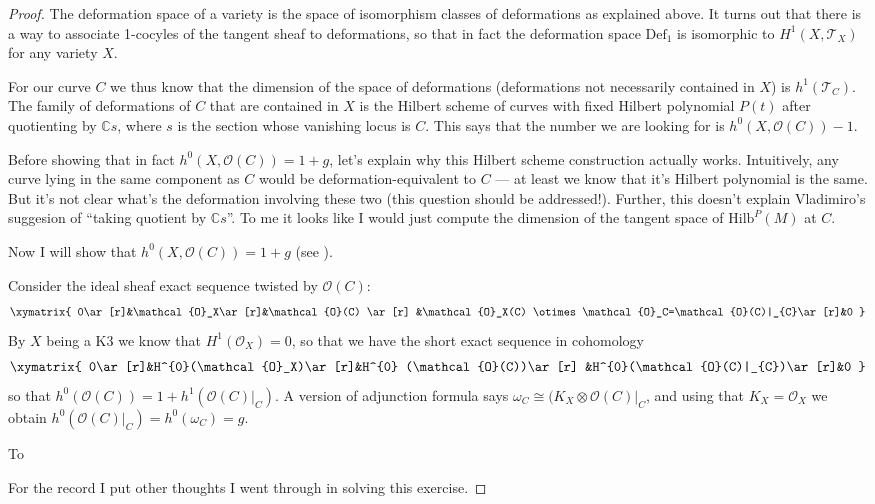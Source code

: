 \documentclass{book}
\begin{document}
\begin{proof}
The deformation space of a variety is the
space of isomorphism classes of
deformations as explained above. It turns out
that there is a way to associate
1-cocyles of the tangent sheaf to
deformations, so that in fact the deformation
space $\text{Def}_1$ is isomorphic to
$H^{1}(X,\mathcal{T}_X)$ for any variety
$X$.

For our curve $C$ we thus know that the
dimension of the space of deformations
(deformations not necessarily contained in
$X$) is $h^1(\mathcal{T}_C)$.  The
family of deformations of $C$ that are
contained in $X$ is the Hilbert scheme of
curves with fixed Hilbert polynomial $P(t)$
after quotienting by $\mathbb{C}s$,
where $s$ is the section whose vanishing
locus is  $C$.
This says that the number we are looking for
is $h^{0}(X,\mathcal{O}(C))-1$.

Before showing that in fact
$h^0(X,\mathcal{O}(C))=1+g$,
let's explain why this Hilbert scheme
construction actually works.
Intuitively, any curve lying in the same
component
as $C$ would be deformation-equivalent to $C$
--- at least we know that it's Hilbert
polynomial is the same.
But it's not clear what's the deformation
involving these two
(this question should be addressed!).
Further, this doesn't explain Vladimiro's
suggesion of ``taking quotient by
$\mathbb{C}s$''.
To me it looks like I would just compute the
dimension
of the tangent space of $\text{Hilb}^P(M)$ at
$C$.

Now I will show that
$h^0(X,\mathcal{O}(C))=1+g$ (see
\cite[Lemma 1.2.1, Remark 1.2.2]{huk}).

Consider the ideal sheaf exact sequence
twisted by
$\mathcal{O}(C)$:
$$
\xymatrix{
0\ar[r]&\mathcal{O}_X\ar[r]&\mathcal{O}(C)
\ar[r]
&\mathcal{O}_X(C) \otimes
\mathcal{O}_C=\mathcal{O}(C)|_{C}\ar[r]&0
}
$$
By $X$ being a K3 we know that
$H^{1}(\mathcal{O}_X)=0$, so that we have the
short exact sequence in cohomology
$$
\xymatrix{
0\ar[r]&H^{0}(\mathcal{O}_X)\ar[r]&H^{0}
(\mathcal{O}(C))\ar[r]
&H^{0}(\mathcal{O}(C)|_{C})\ar[r]&0
}
$$
so that
$h^0(\mathcal{O}(C))=1+h^1(\mathcal{O}(C)
|_{C})$.
A version of adjunction formula says
$\omega_C \cong (K_X
\otimes\mathcal{O}(C)|_{C}$, and using that
$K_X=\mathcal{O}_X$ we obtain
$h^0(\mathcal{O}(C)|_{C})=h^0(\omega_C)=g$.

To

\medskip\noindent
For the record I put other thoughts I went
through in solving this exercise.


\end{proof}
\end{document}
